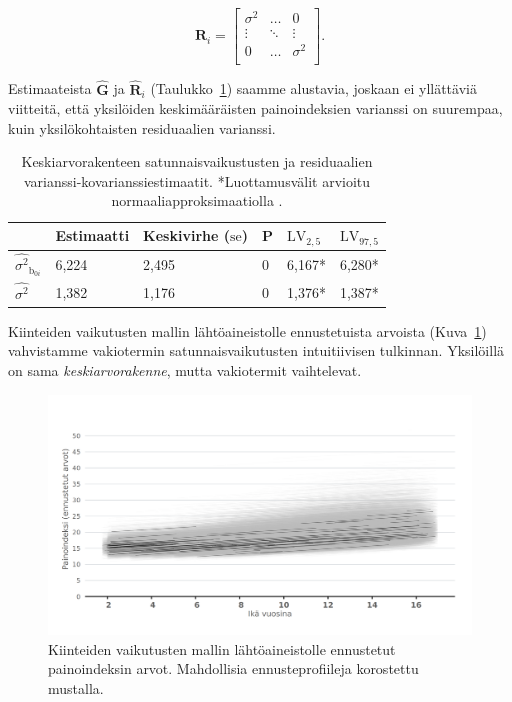 \documentclass[finnish]{docopts}
\begin{document}
$$
\bm{R}_i =
\begin{bmatrix}
\sigma^2 & \dots & 0 \\
\vdots & \ddots & \vdots \\
0 & \dots & \sigma^2 \\
\end{bmatrix}.
$$

Estimaateista $\hat{\bm{G}}$ ja $\hat{\bm{R}}_i$ (Taulukko~\ref{table:lme1}) saamme alustavia, joskaan ei yllättäviä viitteitä, että yksilöiden keskimääräisten painoindeksien varianssi on suurempaa, kuin yksilökohtaisten residuaalien varianssi.\\

\begin{table}[H]
\centering
\begin{tabular}{llllll}
\toprule
  & Estimaatti & Keskivirhe ($\text{se}$) & P & $\text{LV}_{2,5}$ & $\text{LV}_{97,5}$\\
\midrule
$\hat{\sigma^2}_{\text{b}_{0i}}$ & 6,224 & 2,495 & 0 & 6,167* & 6,280*\\
\addlinespace
$\hat{\sigma^2}$ & 1,382 & 1,176 & 0 & 1,376* & 1,387*\\
\bottomrule
\end{tabular}
\caption{Keskiarvorakenteen satunnaisvaikustusten ja residuaalien varianssi-kovarianssiestimaatit. *Luottamusvälit arvioitu normaaliapproksimaatiolla \citep{pinheiro00}.}
\label{table:lme1}
\end{table}

Kiinteiden vaikutusten mallin lähtöaineistolle ennustetuista arvoista (Kuva~\ref{fig:lme1_bmi_pred}) vahvistamme vakiotermin satunnaisvaikutusten intuitiivisen tulkinnan. Yksilöillä on sama \textit{keskiarvorakenne}, mutta vakiotermit vaihtelevat.\\

\begin{figure}[H]
\centering
  \includegraphics[scale=0.8]{kuvaajat/lme_bmi_ennuste.png}
  \caption{Kiinteiden vaikutusten mallin lähtöaineistolle ennustetut painoindeksin arvot. Mahdollisia ennusteprofiileja korostettu mustalla.}
  \label{fig:lme1_bmi_pred}
\end{figure}
\end{document}
